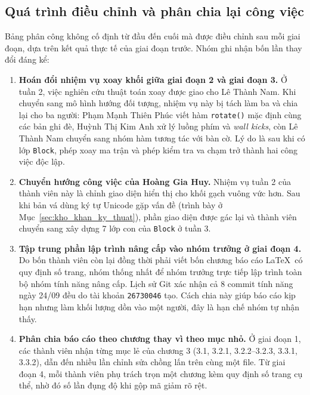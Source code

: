 \subsection{Quá trình điều chỉnh và phân chia lại công việc}

Bảng phân công không cố định từ đầu đến cuối mà được điều chỉnh sau mỗi giai đoạn, dựa trên kết quả thực tế của giai đoạn trước. Nhóm ghi nhận bốn lần thay đổi đáng kể:

\begin{enumerate}
    \item \textbf{Hoán đổi nhiệm vụ xoay khối giữa giai đoạn 2 và giai đoạn 3.} Ở tuần 2, việc nghiên cứu thuật toán xoay được giao cho Lê Thành Nam. Khi chuyển sang mô hình hướng đối tượng, nhiệm vụ này bị tách làm ba và chia lại cho ba người: Phạm Mạnh Thiên Phúc viết hàm \texttt{rotate()} mặc định cùng các bản ghi đè, Huỳnh Thị Kim Anh xử lý luồng phím và \textit{wall kicks}, còn Lê Thành Nam chuyển sang nhóm hàm tương tác với bàn cờ. Lý do là sau khi có lớp \texttt{Block}, phép xoay ma trận và phép kiểm tra va chạm trở thành hai công việc độc lập.

    \item \textbf{Chuyển hướng công việc của Hoàng Gia Huy.} Nhiệm vụ tuần 2 của thành viên này là chỉnh giao diện hiển thị cho khối gạch vuông vức hơn. Sau khi bản vá dùng ký tự Unicode gặp vấn đề (trình bày ở Mục~\ref{sec:kho_khan_ky_thuat}), phần giao diện được gác lại và thành viên chuyển sang xây dựng 7 lớp con của \texttt{Block} ở tuần 3.

    \item \textbf{Tập trung phần lập trình nâng cấp vào nhóm trưởng ở giai đoạn 4.} Do bốn thành viên còn lại đồng thời phải viết bốn chương báo cáo \LaTeX\ có quy định số trang, nhóm thống nhất để nhóm trưởng trực tiếp lập trình toàn bộ nhóm tính năng nâng cấp. Lịch sử Git xác nhận cả 8 commit tính năng ngày 24/09 đều do tài khoản \texttt{26730046} tạo. Cách chia này giúp báo cáo kịp hạn nhưng làm khối lượng dồn vào một người, đây là hạn chế nhóm tự nhận thấy.

    \item \textbf{Phân chia báo cáo theo chương thay vì theo mục nhỏ.} Ở giai đoạn 1, các thành viên nhận từng mục lẻ của chương 3 (3.1, 3.2.1, 3.2.2--3.2.3, 3.3.1, 3.3.2), dẫn đến nhiều lần chỉnh sửa chồng lấn trên cùng một file. Từ giai đoạn 4, mỗi thành viên phụ trách trọn một chương kèm quy định số trang cụ thể, nhờ đó số lần đụng độ khi gộp mã giảm rõ rệt.
\end{enumerate}

